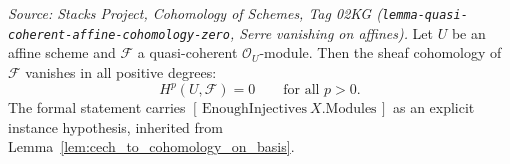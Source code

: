 \begin{lemma}
  \label{lem:affine_serre_vanishing}
  \textit{Source: Stacks Project, Cohomology of Schemes, Tag 02KG
  (\texttt{lemma-quasi-coherent-affine-cohomology-zero}, Serre vanishing on
  affines).}
  Let \(U\) be an affine scheme and \(\mathcal{F}\) a quasi-coherent
  \(\mathcal{O}_U\)-module. Then the sheaf cohomology of \(\mathcal{F}\) vanishes in
  all positive degrees:
  \[
    H^p(U, \mathcal{F}) = 0 \qquad \text{for all } p > 0.
  \]
  The formal statement carries \([\,\mathrm{EnoughInjectives}\ X.\mathrm{Modules}\,]\) as an
  explicit instance hypothesis, inherited from Lemma~\ref{lem:cech_to_cohomology_on_basis}.
\end{lemma}

